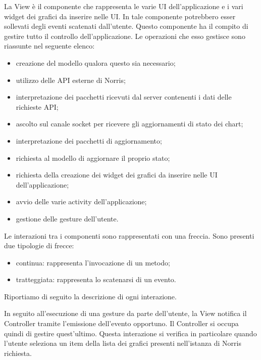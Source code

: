         La View è il componente che rappresenta le varie UI dell'applicazione e i vari widget dei grafici da inserire nelle UI. In tale componente potrebbero esser sollevati degli eventi scatenati dall'utente.
        Questo componente ha il compito di gestire tutto il controllo dell'applicazione. Le operazioni che esso gestisce sono riassunte nel seguente elenco:
        	\begin{itemize}
        		\item creazione del modello qualora questo sia necessario;
        		\item utilizzo delle API esterne di Norris;
        		\item interpretazione dei pacchetti ricevuti dal server contenenti i dati delle richieste API;
        		\item ascolto sul canale socket per ricevere gli aggiornamenti di stato dei chart;
        		\item interpretazione dei pacchetti di aggiornamento;
        		\item richiesta al modello di aggiornare il proprio stato;
        		\item richiesta della creazione dei widget dei grafici da inserire nelle UI dell'applicazione;
        		\item avvio delle varie activity dell'applicazione;
        		\item gestione delle gesture dell'utente.
        \end{itemize}
    	Le interazioni tra i componenti sono rappresentati con una freccia. Sono presenti due tipologie di frecce:
    	\begin{itemize}
    			\item{continua: } rappresenta l'invocazione di un metodo;
    			\item{tratteggiata: } rappresenta lo scatenarsi di un evento.
    		\end{itemize}

    	Riportiamo di seguito la descrizione di ogni interazione.

        In seguito all'esecuzione di una gesture da parte dell'utente, la View notifica il Controller tramite l'emissione dell'evento opportuno. Il Controller si occupa quindi di gestire quest'ultimo. Questa interazione si verifica in particolare quando l'utente seleziona un item della lista dei grafici presenti nell'istanza di Norris richiesta.

